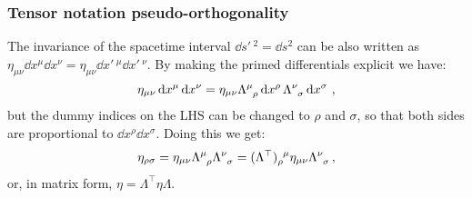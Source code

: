 \documentclass[main.tex]{subfiles}
\begin{document}
\subsubsection{Tensor notation pseudo-orthogonality}

The invariance of the spacetime interval $\dd{s'\,^2} = \dd{s^2}$ can be also written as \(\eta_{\mu\nu} \dd{x^\mu} \dd{x^\nu} = \eta_{\mu\nu} \dd{x'\,^\mu} \dd{x'\,^\nu}\). By making the primed differentials explicit we have:
%
\begin{equation}
  \eta_{\mu\nu} \dd{x^\mu} \dd{x^\nu}
  =
  \eta_{\mu\nu} \tensor{\Lambda}{^\mu_\rho} \dd{x^\rho} \tensor{\Lambda}{^\nu_\sigma} \dd{x^\sigma} \,,
\end{equation}
%
but the dummy indices on the LHS can be changed to \(\rho\) and \(\sigma\), so that both sides are proportional to  \(\dd{x^\rho}\dd{x^\sigma}\). Doing this we get:
%
\begin{equation}
  \eta_{\rho\sigma}
  =
  \eta_{\mu\nu} \tensor{\Lambda}{^\mu_\rho} \tensor{\Lambda}{^\nu_\sigma}
  =\tensor{(\Lambda^\top)}{_\rho^\mu} \eta_{\mu\nu} \tensor{\Lambda}{^\nu_\sigma} \,,
\end{equation}
%
or, in matrix form, \(\eta = \Lambda^\top \eta \Lambda\).


\end{document}
